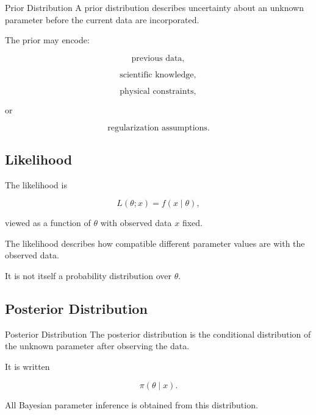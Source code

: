 \begin{definitionbox}{Prior Distribution}
A prior distribution describes uncertainty about an unknown parameter
before the current data are incorporated.
\end{definitionbox}

The prior may encode:

\[
\boxed{
\text{previous data},
}
\]

\[
\boxed{
\text{scientific knowledge},
}
\]

\[
\boxed{
\text{physical constraints},
}
\]

or

\[
\boxed{
\text{regularization assumptions}.
}
\]

\subsection{Likelihood}
\label{subsec:bayesian-likelihood}

The likelihood is

\[
\boxed{
L(\theta;x)
=
f(x\mid\theta),
}
\]

viewed as a function of \(\theta\) with observed data \(x\) fixed.

The likelihood describes how compatible different parameter values are
with the observed data.

It is not itself a probability distribution over \(\theta\).

\subsection{Posterior Distribution}
\label{subsec:posterior-distribution}

\begin{definitionbox}{Posterior Distribution}
The posterior distribution is the conditional distribution of the
unknown parameter after observing the data.
\end{definitionbox}

It is written

\[
\boxed{
\pi(\theta\mid x).
}
\]

All Bayesian parameter inference is obtained from this distribution.

